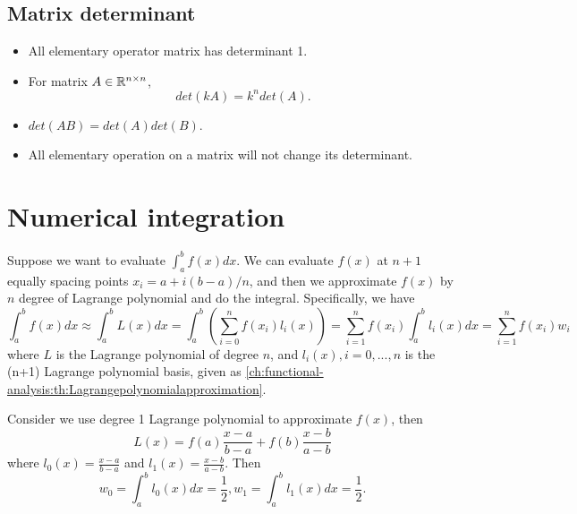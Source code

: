 \begin{refsection}
\subsection{Matrix determinant}

\begin{lemma}\label{appendix:th:matrixDeterminantProperties} \hfill
\begin{itemize}
	\item All elementary operator matrix has determinant 1.
	\item For matrix $A\in \mathbb{R}^{n\times n}$, $$det(kA) = k^n det(A).$$
	\item $det(AB) = det(A)det(B)$.
	\item All elementary operation on a matrix will not change its determinant. 
\end{itemize}	
\end{lemma}





\section{Numerical integration}
\begin{definition}
Suppose we want to evaluate $\int_a^b f(x)dx$. We can evaluate $f(x)$ at $n+1$ equally spacing points $x_i = a + i(b-a)/n$, and then we approximate $f(x)$ by $n$ degree of Lagrange polynomial and do the integral. Specifically, we have
	$$\int_a^b f(x)dx \approx \int_a^b L(x)dx = \int_a^b (\sum_{i=0}^n f(x_i)l_i(x)) = \sum_{i=1}^n f(x_i)\int_a^b l_i(x)dx = \sum_{i=1}^n f(x_i)w_i$$
where $L$ is the Lagrange polynomial of degree $n$, and $l_i(x),i=0,...,n$ is the (n+1) Lagrange polynomial basis, given as \autoref{ch:functional-analysis:th:Lagrangepolynomialapproximation}.
\end{definition}

\begin{example}
Consider we use degree 1 Lagrange polynomial to approximate $f(x)$, then
$$L(x) = f(a)\frac{x-a}{b-a} + f(b)\frac{x-b}{a-b}$$
where $l_0(x) = \frac{x-a}{b-a}$ and $l_1(x) = \frac{x-b}{a-b}$. Then
$$w_0 = \int_a^b l_0(x)dx = \frac{1}{2},w_1 = \int_a^b l_1(x)dx=\frac{1}{2}.$$	
\end{example}





\end{refsection}
